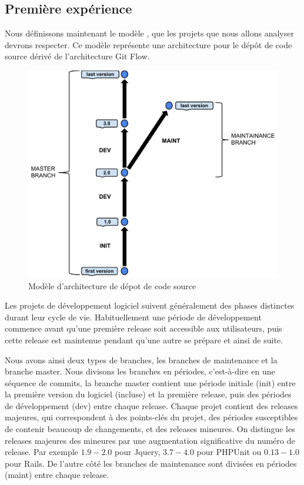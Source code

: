 \subsection{Première expérience}

Nous définissons maintenant le modèle , que les projets que nous allons analyser devrons respecter. Ce modèle représente une architecture pour le dépôt de code source dérivé de l'architecture Git Flow.\\

\begin{figure}[h]
  \centering
  \includegraphics[scale=0.5]{data/figures/periods.pdf}
	\caption{Modèle d'architecture de dépot de code source}
	\label{fig:model}
\end{figure}

Les projets de développement logiciel suivent généralement des phases distinctes durant leur cycle de vie. Habituellement une période de développement commence avant qu'une première release soit accessible aux utilisateurs, puis cette release est maintenue pendant qu'une autre se prépare et ainsi de suite.

Nous avons ainsi deux types de branches, les branches de maintenance et la branche master. Nous divisons les branches en périodes, c'est-à-dire en une séquence de commits, la branche master contient une période initiale (init) entre la première version du logiciel (incluse) et la première release, puis des périodes de développement (dev) entre chaque release. Chaque projet contient des releases majeures, qui correspondent à des points-clés du projet, des périodes susceptibles de contenir beaucoup de changements, et des releases mineures. On distingue les releases majeures des mineures par une augmentation significative du numéro de release. Par exemple $1.9-2.0$ pour Jquery, $3.7-4.0$ pour PHPUnit ou $0.13-1.0$ pour Rails. De l'autre côté les branches de maintenance sont divisées en périodes (maint) entre chaque release.\\

